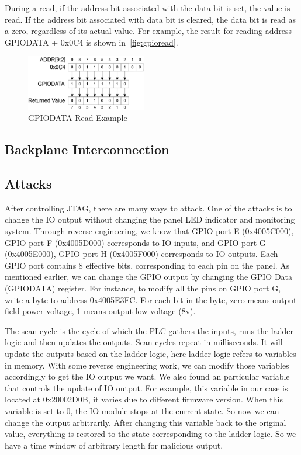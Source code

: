 During a read, if the address bit associated with the data bit is set, the value is read. If the address bit associated with data bit is cleared, the data bit is read as a zero, regardless of its actual value. For example, the result for reading address GPIODATA + 0x0C4 is shown in~\autoref{fig:gpioread}.

\begin{figure}[th]
	\includegraphics[width=0.47\textwidth]{figures/gpioread}
	\centering
	\caption{GPIODATA Read Example~\cite{lm3s2793}}
	\label{fig:gpioread}
\end{figure}

\subsection{Backplane Interconnection}


\subsection{Attacks}
After controlling JTAG, there are many ways to attack. One of the attacks is to change the IO output without changing the panel LED indicator and monitoring system. Through reverse engineering, we know that GPIO port E (0x4005C000), GPIO port F (0x4005D000) corresponds to IO inputs, and GPIO port G (0x4005E000), GPIO port H (0x4005F000) corresponds to IO outputs. Each GPIO port contains 8 effective bits, corresponding to each pin on the panel. As mentioned earlier, we can change the GPIO output by changing the GPIO Data (GPIODATA) register. For instance, to modify all the pins on GPIO port G, write a byte to address 0x4005E3FC. For each bit in the byte, zero means output field power voltage, 1 means output low voltage (8v).

The scan cycle is the cycle of which the PLC gathers the inputs, runs the ladder logic and then updates the outputs. Scan cycles repeat in milliseconds. It will update the outputs based on the ladder logic, here ladder logic refers to variables in memory. With some reverse engineering work, we can modify those variables accordingly to get the IO output we want. We also found an particular variable that controls the update of IO output. For example, this variable in our case is located at 0x20002D0B, it varies due to different firmware version. When this variable is set to 0, the IO module stops at the current state. So now we can change the output arbitrarily. After changing this variable back to the original value, everything is restored to the state corresponding to the ladder logic. So we have a time window of arbitrary length for malicious output. 



